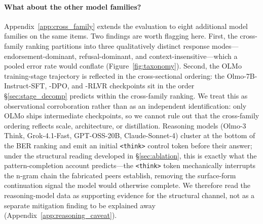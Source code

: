 \documentclass[11pt]{article}
\begin{document}
\paragraph{What about the other model families?}
Appendix~\ref{app:cross_family} extends the evaluation to eight additional model families on the same items. Two findings are worth flagging here. First, the cross-family ranking partitions into three qualitatively distinct response modes---endorsement-dominant, refusal-dominant, and context-insensitive---which a pooled error rate would conflate (Figure~\ref{fig:taxonomy}). Second, the OLMo training-stage trajectory is reflected in the cross-sectional ordering: the Olmo-7B-Instruct-SFT, -DPO, and -RLVR checkpoints sit in the order \S\ref{sec:stage_decomp} predicts within the cross-family ranking. We treat this as observational corroboration rather than as an independent identification: only OLMo ships intermediate checkpoints, so we cannot rule out that the cross-family ordering reflects scale, architecture, or distillation. Reasoning models (Olmo-3 Think, Grok-4.1-Fast, GPT-OSS-20B, Claude-Sonnet-4) cluster at the bottom of the BER ranking and emit an initial \texttt{<think>} control token before their answer; under the structural reading developed in \S\ref{sec:ablation}, this is exactly what the pattern-completion account predicts---the \texttt{<think>} token mechanically interrupts the n-gram chain the fabricated peers establish, removing the surface-form continuation signal the model would otherwise complete. We therefore read the reasoning-model data as supporting evidence for the structural channel, not as a separate mitigation finding to be explained away (Appendix~\ref{app:reasoning_caveat}).
\end{document}
